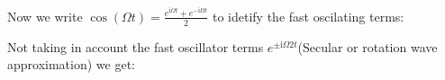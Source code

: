 \documentclass[%
preprint,
onecolumn,
notitlepag,
 amsmath,amssymb,
 aps,
 pra,
]{revtex4-2}
\begin{document}
Now we write $\cos(\Omega t) = \frac{e^{\mathrm{i} \Omega t} + e^{-\mathrm{i} \Omega t} }{2}$ to idetify the fast oscilating terms: 




Not taking in account the fast oscillator terms $e^{\pm  \mathrm{i} \Omega 2t }$(Secular or rotation wave approximation) we get: 
\end{document}
